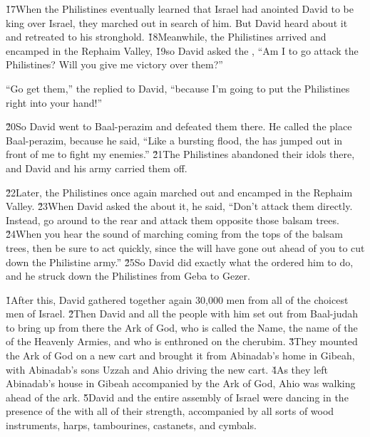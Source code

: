\v{17}When the Philistines eventually learned that Israel had anointed David to be king over Israel, they marched out in search of him. But David heard about it and retreated to his stronghold. \v{18}Meanwhile, the Philistines arrived and encamped in the Rephaim Valley, \v{19}so David asked the , ``Am I to go attack the Philistines? Will you give me victory over them?''

``Go get them,'' the  replied to David, ``because I'm going to put the Philistines right into your hand!''

\v{20}So David went to Baal-perazim and defeated them there. He called the place Baal-perazim, because he said, ``Like a bursting flood, the  has jumped out in front of me to fight my enemies.'' \v{21}The Philistines abandoned their idols there, and David and his army carried them off.

\v{22}Later, the Philistines once again marched out and encamped in the Rephaim Valley. \v{23}When David asked the  about it, he said, ``Don't attack them directly. Instead, go around to the rear and attack them opposite those balsam trees. \v{24}When you hear the sound of marching coming from the tops of the balsam trees, then be sure to act quickly, since the  will have gone out ahead of you to cut down the Philistine army.'' \v{25}So David did exactly what the  ordered him to do, and he struck down the Philistines from Geba to Gezer.

\v{1}After this, David gathered together again 30,000 men from all of the choicest men of Israel. \v{2}Then David and all the people with him set out from Baal-judah to bring up from there the Ark of God, who is called the Name, the name of the  of the Heavenly Armies, and who is enthroned on the cherubim. \v{3}They mounted the Ark of God on a new cart and brought it from Abinadab's home in Gibeah, with Abinadab's sons Uzzah and Ahio driving the new cart. \v{4}As they left Abinadab's house in Gibeah accompanied by the Ark of God, Ahio was walking ahead of the ark. \v{5}David and the entire assembly of Israel were dancing in the presence of the  with all of their strength, accompanied by all sorts of wood instruments, harps, tambourines, castanets, and cymbals.

